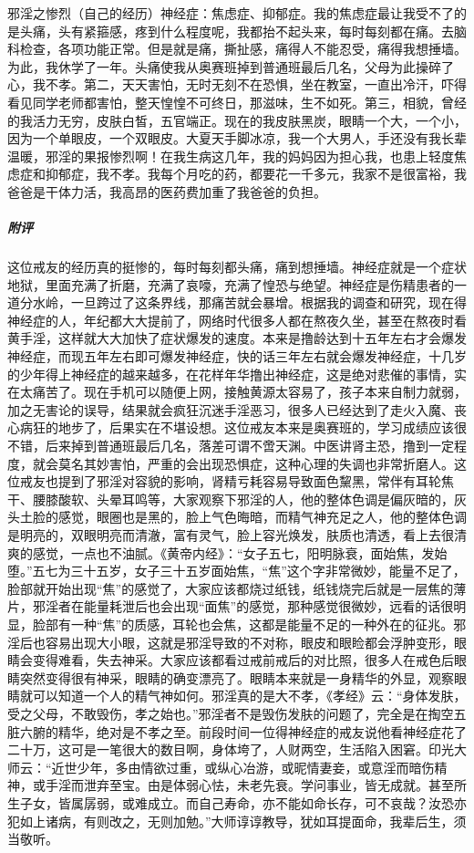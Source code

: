 \begin{case}
    邪淫之惨烈（自己的经历）神经症：焦虑症、抑郁症。我的焦虑症最让我受不了的是头痛，头有紧箍感，疼到什么程度呢，我都抬不起头来，每时每刻都在痛。去脑科检查，各项功能正常。但是就是痛，撕扯感，痛得人不能忍受，痛得我想捶墙。为此，我休学了一年。头痛使我从奥赛班掉到普通班最后几名，父母为此操碎了心，我不孝。第二，天天害怕，无时无刻不在恐惧，坐在教室，一直出冷汗，吓得看见同学老师都害怕，整天惶惶不可终日，那滋味，生不如死。第三，相貌，曾经的我活力无穷，皮肤白皙，五官端正。现在的我皮肤黑炭，眼睛一个大，一个小，因为一个单眼皮，一个双眼皮。大夏天手脚冰凉，我一个大男人，手还没有我长辈温暖，邪淫的果报惨烈啊！在我生病这几年，我的妈妈因为担心我，也患上轻度焦虑症和抑郁症，我不孝。我每个月吃的药，都要花一千多元，我家不是很富裕，我爸爸是干体力活，我高昂的医药费加重了我爸爸的负担。
    \subparagraph{附评} 这位戒友的经历真的挺惨的，每时每刻都头痛，痛到想捶墙。神经症就是一个症状地狱，里面充满了折磨，充满了哀嚎，充满了惶恐与绝望。神经症是伤精患者的一道分水岭，一旦跨过了这条界线，那痛苦就会暴增。根据我的调查和研究，现在得神经症的人，年纪都大大提前了，网络时代很多人都在熬夜久坐，甚至在熬夜时看黄手淫，这样就大大加快了症状爆发的速度。本来是撸龄达到十五年左右才会爆发神经症，而现五年左右即可爆发神经症，快的话三年左右就会爆发神经症，十几岁的少年得上神经症的越来越多，在花样年华撸出神经症，这是绝对悲催的事情，实在太痛苦了。现在手机可以随便上网，接触黄源太容易了，孩子本来自制力就弱，加之无害论的误导，结果就会疯狂沉迷手淫恶习，很多人已经达到了走火入魔、丧心病狂的地步了，后果实在不堪设想。这位戒友本来是奥赛班的，学习成绩应该很不错，后来掉到普通班最后几名，落差可谓不啻天渊。中医讲肾主恐，撸到一定程度，就会莫名其妙害怕，严重的会出现恐惧症，这种心理的失调也非常折磨人。这位戒友也提到了邪淫对容貌的影响，肾精亏耗容易导致面色黧黑，常伴有耳轮焦干、腰膝酸软、头晕耳鸣等，大家观察下邪淫的人，他的整体色调是偏灰暗的，灰头土脸的感觉，眼圈也是黑的，脸上气色晦暗，而精气神充足之人，他的整体色调是明亮的，双眼明亮而清澈，富有灵气，脸上容光焕发，肤质也清透，看上去很清爽的感觉，一点也不油腻。《黄帝内经》：“女子五七，阳明脉衰，面始焦，发始堕。”五七为三十五岁，女子三十五岁面始焦，“焦”这个字非常微妙，能量不足了，脸部就开始出现“焦”的感觉了，大家应该都烧过纸钱，纸钱烧完后就是一层焦的薄片，邪淫者在能量耗泄后也会出现“面焦”的感觉，那种感觉很微妙，远看的话很明显，脸部有一种“焦”的质感，耳轮也会焦，这都是能量不足的一种外在的征兆。邪淫后也容易出现大小眼，这就是邪淫导致的不对称，眼皮和眼睑都会浮肿变形，眼睛会变得难看，失去神采。大家应该都看过戒前戒后的对比照，很多人在戒色后眼睛突然变得很有神采，眼睛的确变漂亮了。眼睛本来就是一身精华的外显，观察眼睛就可以知道一个人的精气神如何。邪淫真的是大不孝，《孝经》云：“身体发肤，受之父母，不敢毁伤，孝之始也。”邪淫者不是毁伤发肤的问题了，完全是在掏空五脏六腑的精华，绝对是不孝之至。前段时间一位得神经症的戒友说他看神经症花了二十万，这可是一笔很大的数目啊，身体垮了，人财两空，生活陷入困窘。印光大师云：“近世少年，多由情欲过重，或纵心冶游，或昵情妻妾，或意淫而暗伤精神，或手淫而泄弃至宝。由是体弱心怯，未老先衰。学问事业，皆无成就。甚至所生子女，皆属孱弱，或难成立。而自己寿命，亦不能如命长存，可不哀哉？汝恐亦犯如上诸病，有则改之，无则加勉。”大师谆谆教导，犹如耳提面命，我辈后生，须当敬听。
\end{case}

